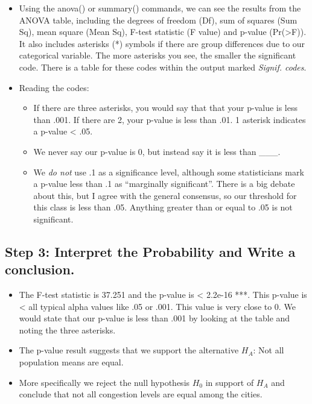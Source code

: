 \documentclass[
  letterpaper,
  DIV=11,
  numbers=noendperiod]{scrreprt}
\providecommand{\tightlist}{%
  \setlength{\itemsep}{0pt}\setlength{\parskip}{0pt}}\usepackage{longtable,booktabs,array}
\begin{document}
\begin{itemize}
\tightlist
\item
  Using the anova() or summary() commands, we can see the results from
  the ANOVA table, including the degrees of freedom (Df), sum of squares
  (Sum Sq), mean square (Mean Sq), F-test statistic (F value) and
  p-value (Pr(\textgreater F)). It also includes asterisks (*) symbols
  if there are group differences due to our categorical variable. The
  more asterisks you see, the smaller the significant code. There is a
  table for these codes within the output marked \emph{Signif. codes}.
\item
  Reading the codes:

  \begin{itemize}
  \tightlist
  \item
    If there are three asterisks, you would say that that your p-value
    is less than .001. If there are 2, your p-value is less than .01. 1
    asterisk indicates a p-value \textless{} .05.
  \item
    We never say our p-value is 0, but instead say it is less than
    \_\_\_.
  \item
    We \emph{do not} use .1 as a significance level, although some
    statisticians mark a p-value less than .1 as ``marginally
    significant''. There is a big debate about this, but I agree with
    the general consensus, so our threshold for this class is less than
    .05. Anything greater than or equal to .05 is not significant.
  \end{itemize}
\end{itemize}

\subsection{Step 3: Interpret the Probability and Write a
conclusion.}\label{step-3-interpret-the-probability-and-write-a-conclusion.}

\begin{itemize}
\tightlist
\item
  The F-test statistic is 37.251 and the p-value is \textless{} 2.2e-16
  ***. This p-value is \textless{} all typical alpha values like .05 or
  .001. This value is very close to 0. We would state that our p-value
  is less than .001 by looking at the table and noting the three
  asterisks.\\
\item
  The p-value result suggests that we support the alternative \(H_A\):
  Not all population means are equal.
\item
  More specifically we reject the null hypothesis \(H_0\) in support of
  \(H_A\) and conclude that not all congestion levels are equal among
  the cities.
\end{itemize}
\end{document}
